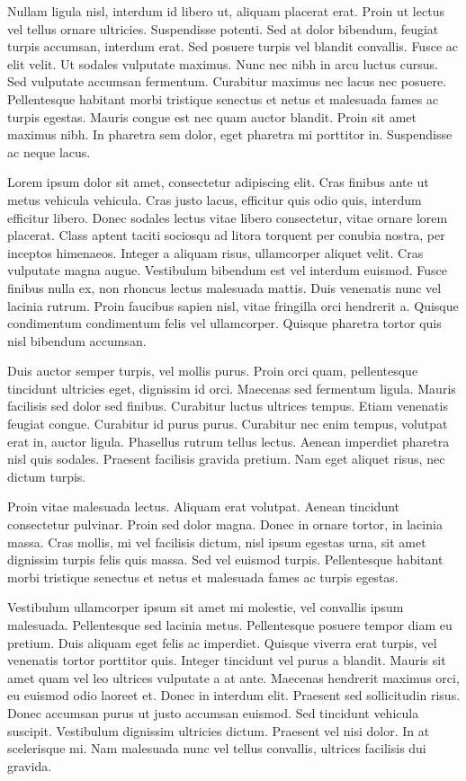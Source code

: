 \documentclass[a4paper]{article}
\begin{document}
\begin{multicols}{2}
Nullam ligula nisl, interdum id libero ut, aliquam placerat erat. Proin ut lectus vel tellus ornare ultricies. Suspendisse potenti. Sed at dolor bibendum, feugiat turpis accumsan, interdum erat. Sed posuere turpis vel blandit convallis. Fusce ac elit velit. Ut sodales vulputate maximus. Nunc nec nibh in arcu luctus cursus. Sed vulputate accumsan fermentum. Curabitur maximus nec lacus nec posuere. Pellentesque habitant morbi tristique senectus et netus et malesuada fames ac turpis egestas. Mauris congue est nec quam auctor blandit. Proin sit amet maximus nibh. In pharetra sem dolor, eget pharetra mi porttitor in. Suspendisse ac neque lacus.

Lorem ipsum dolor sit amet, consectetur adipiscing elit. Cras finibus ante ut metus vehicula vehicula. Cras justo lacus, efficitur quis odio quis, interdum efficitur libero. Donec sodales lectus vitae libero consectetur, vitae ornare lorem placerat. Class aptent taciti sociosqu ad litora torquent per conubia nostra, per inceptos himenaeos. Integer a aliquam risus, ullamcorper aliquet velit. Cras vulputate magna augue. Vestibulum bibendum est vel interdum euismod. Fusce finibus nulla ex, non rhoncus lectus malesuada mattis. Duis venenatis nunc vel lacinia rutrum. Proin faucibus sapien nisl, vitae fringilla orci hendrerit a. Quisque condimentum condimentum felis vel ullamcorper. Quisque pharetra tortor quis nisl bibendum accumsan.

Duis auctor semper turpis, vel mollis purus. Proin orci quam, pellentesque tincidunt ultricies eget, dignissim id orci. Maecenas sed fermentum ligula. Mauris facilisis sed dolor sed finibus. Curabitur luctus ultrices tempus. Etiam venenatis feugiat congue. Curabitur id purus purus. Curabitur nec enim tempus, volutpat erat in, auctor ligula. Phasellus rutrum tellus lectus. Aenean imperdiet pharetra nisl quis sodales. Praesent facilisis gravida pretium. Nam eget aliquet risus, nec dictum turpis.

Proin vitae malesuada lectus. Aliquam erat volutpat. Aenean tincidunt consectetur pulvinar. Proin sed dolor magna. Donec in ornare tortor, in lacinia massa. Cras mollis, mi vel facilisis dictum, nisl ipsum egestas urna, sit amet dignissim turpis felis quis massa. Sed vel euismod turpis. Pellentesque habitant morbi tristique senectus et netus et malesuada fames ac turpis egestas.

Vestibulum ullamcorper ipsum sit amet mi molestie, vel convallis ipsum malesuada. Pellentesque sed lacinia metus. Pellentesque posuere tempor diam eu pretium. Duis aliquam eget felis ac imperdiet. Quisque viverra erat turpis, vel venenatis tortor porttitor quis. Integer tincidunt vel purus a blandit. Mauris sit amet quam vel leo ultrices vulputate a at ante. Maecenas hendrerit maximus orci, eu euismod odio laoreet et. Donec in interdum elit. Praesent sed sollicitudin risus. Donec accumsan purus ut justo accumsan euismod. Sed tincidunt vehicula suscipit. Vestibulum dignissim ultricies dictum. Praesent vel nisi dolor. In at scelerisque mi. Nam malesuada nunc vel tellus convallis, ultrices facilisis dui gravida. 


\end{multicols}
\end{document}
